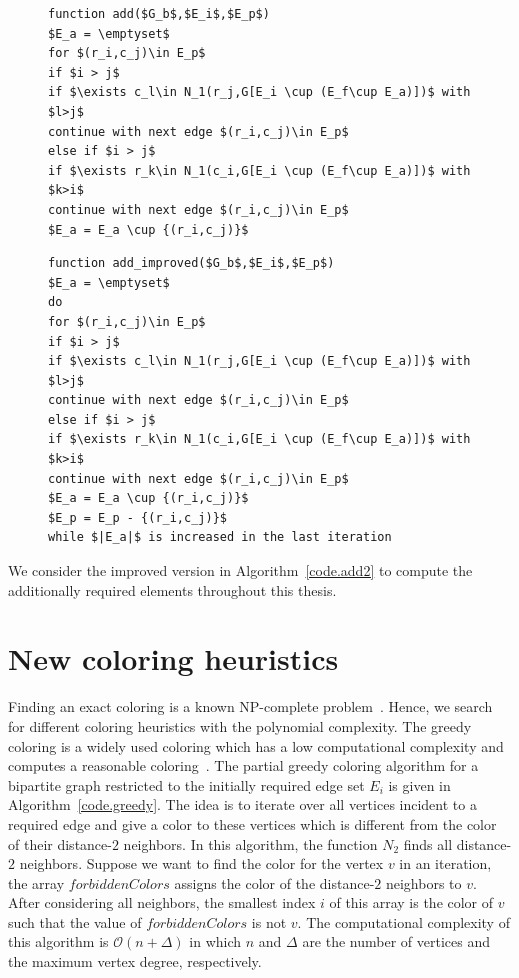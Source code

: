 \documentclass[12pt, twoside,a4paper,toc=bibliography]{scrbook}
\newcommand{\coderef}[1]{Algorithm~\protect\ref{#1}}
\begin{document}
\begin{figure}
\begin{lstlisting}[caption=Find additionally required elements,
label=code.add,mathescape]
function add($G_b$,$E_i$,$E_p$)
$E_a = \emptyset$
for $(r_i,c_j)\in E_p$
if $i > j$
if $\exists c_l\in N_1(r_j,G[E_i \cup (E_f\cup E_a)])$ with $l>j$
continue with next edge $(r_i,c_j)\in E_p$
else if $i > j$
if $\exists r_k\in N_1(c_i,G[E_i \cup (E_f\cup E_a)])$ with $k>i$
continue with next edge $(r_i,c_j)\in E_p$
$E_a = E_a \cup {(r_i,c_j)}$
\end{lstlisting}
\end{figure}

\begin{figure}
\begin{lstlisting}[caption=Find additionally required elements (an improved version),
label=code.add2,mathescape]
function add_improved($G_b$,$E_i$,$E_p$)
$E_a = \emptyset$
do
for $(r_i,c_j)\in E_p$
if $i > j$
if $\exists c_l\in N_1(r_j,G[E_i \cup (E_f\cup E_a)])$ with $l>j$
continue with next edge $(r_i,c_j)\in E_p$
else if $i > j$
if $\exists r_k\in N_1(c_i,G[E_i \cup (E_f\cup E_a)])$ with $k>i$
continue with next edge $(r_i,c_j)\in E_p$
$E_a = E_a \cup {(r_i,c_j)}$
$E_p = E_p - {(r_i,c_j)}$
while $|E_a|$ is increased in the last iteration
\end{lstlisting}
\end{figure}
We consider the improved version in \coderef{code.add2}
to compute the additionally required elements
throughout this thesis.

\chapter{New coloring heuristics}
\label{package}
Finding an exact coloring is a known NP-complete problem~\cite{SPINRAD198589}.
Hence, we search for different coloring heuristics with the polynomial complexity.
The greedy coloring is a widely used coloring which has a low computational complexity
and computes a reasonable coloring~\cite{spaa14}.
The partial greedy coloring algorithm for a bipartite graph restricted to 
the initially required edge set $E_i$ is given in \coderef{code.greedy}. 
The idea is to iterate over all vertices incident
to a required edge and give a color to these vertices which is different from
the color of their distance-$2$ neighbors. In this algorithm, the function $N_2$
finds all distance-$2$ neighbors. 
Suppose we want to find the color for the vertex $v$ in an iteration, 
the array $forbiddenColors$ assigns the color of the distance-$2$ neighbors
to $v$. After considering all neighbors, the smallest index $i$ of this array
is the color of $v$ such that the value of $forbiddenColors$ is not $v$.
The computational complexity of this algorithm is $\mathcal{O}(n + \Delta)$ in which $n$
and $\Delta$ are the number of vertices and the maximum vertex degree, respectively.
\end{document}
